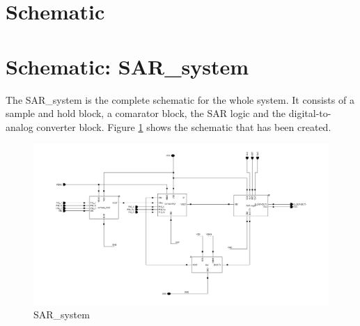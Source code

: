 \documentclass[english, a4paper,11pt]{article}
\begin{document}
\section{Schematic}  
\section*{Schematic: SAR\_system}
The SAR\_system is the complete schematic for the whole system. It consists of a sample and hold block, a comarator block, the SAR logic and the digital-to-analog converter block. Figure 
\ref{sar:system} shows the schematic that has been created.\\
\begin{figure}[!ht]
 \centering
   \includegraphics[width=\textwidth]{img/SAR_system}
   \caption{SAR\_system}
   \label{sar:system}
\end{figure}
\end{document}
